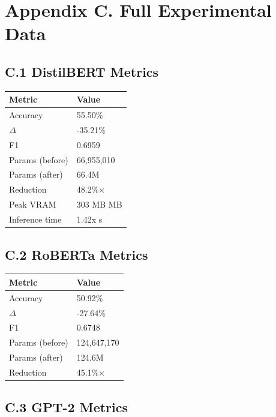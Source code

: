 
\section{Appendix C. Full Experimental Data}

\subsection{C.1 DistilBERT Metrics}

\begin{table}[H]
\centering
\small
\begin{tabular}{ll}
\toprule
\textbf{Metric} & \textbf{Value} \\
\midrule
Accuracy & 55.50\% \\
$\Delta$ & -35.21\% \\
F1 & 0.6959 \\
Params (before) & 66,955,010 \\
Params (after) & 66.4M \\
Reduction & 48.2\%$\times$ \\
Peak VRAM & 303 MB MB \\
Inference time & 1.42x s \\
\bottomrule
\end{tabular}
\end{table}

\subsection{C.2 RoBERTa Metrics}

\begin{table}[H]
\centering
\small
\begin{tabular}{ll}
\toprule
\textbf{Metric} & \textbf{Value} \\
\midrule
Accuracy & 50.92\% \\
$\Delta$ & -27.64\% \\
F1 & 0.6748 \\
Params (before) & 124,647,170 \\
Params (after) & 124.6M \\
Reduction & 45.1\%$\times$ \\
\bottomrule
\end{tabular}
\end{table}

\subsection{C.3 GPT-2 Metrics}

